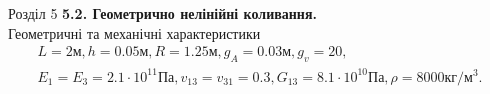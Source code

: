 \documentclass[8pt]{beamer}
\numberwithin{figure}{section}
\numberwithin{equation}{section}
\numberwithin{table}{section}
\begin{document}
\begin{frame}{Розділ 5}
\textbf{5.2. Геометрично нелінійні коливання.}
\\
\vspace{1em}
Геометричні та механічні  характеристики
\begin{gather*}
L=2\text{м}, h=0.05\text{м},R=1.25\text{м},g_A=0.03\text{м}, g_v=20,\\
E_1=E_3=2.1\cdot 10^{11} Па, v_{13}=v_{31}=0.3, G_{13}=8.1\cdot 10^{10} Па, \rho=8000 кг/м^3.
\end{gather*}
\begin{table}[h!]
\centering
{}
\caption{Залежність найменшої власної частоти ($\omega$) від частоти гофрування ($g_v$) панелі}
\label{table:51}
\end{table}


\end{frame}
\end{document}
